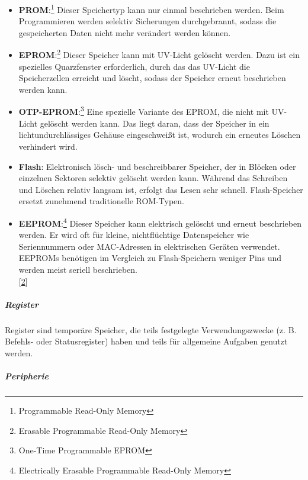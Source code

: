 \documentclass[
    headings=optiontotocandhead,%
    twoside,
    numbers=noenddot,%
    12pt, %
    titlepage, %
    parskip=full, %
    listof=leveldown, 
    numbers=noenddot, %
    a4paper,DIV=14,
    BCOR=15mm,
]{scrbook}
\begin{document}
\begin{itemize}
\item
  \textbf{PROM}:\footnote{Programmable Read-Only Memory} Dieser
  Speichertyp kann nur einmal beschrieben werden. Beim Programmieren
  werden selektiv Sicherungen durchgebrannt, sodass die gespeicherten
  Daten nicht mehr verändert werden können.
\item
  \textbf{EPROM}:\footnote{Erasable Programmable Read-Only Memory}
  Dieser Speicher kann mit UV-Licht gelöscht werden. Dazu ist ein
  spezielles Quarzfenster erforderlich, durch das das UV-Licht die
  Speicherzellen erreicht und löscht, sodass der Speicher erneut
  beschrieben werden kann.
\item
  \textbf{OTP-EPROM}:\footnote{One-Time Programmable EPROM} Eine
  spezielle Variante des EPROM, die nicht mit UV-Licht gelöscht werden
  kann. Das liegt daran, dass der Speicher in ein lichtundurchlässiges
  Gehäuse eingeschweißt ist, wodurch ein erneutes Löschen verhindert
  wird.
\item
  \textbf{Flash}: Elektronisch lösch- und beschreibbarer Speicher, der
  in Blöcken oder einzelnen Sektoren selektiv gelöscht werden kann.
  Während das Schreiben und Löschen relativ langsam ist, erfolgt das
  Lesen sehr schnell. Flash-Speicher ersetzt zunehmend traditionelle
  ROM-Typen.
\item
  \textbf{EEPROM}:\footnote{Electrically Erasable Programmable Read-Only
    Memory} Dieser Speicher kann elektrisch gelöscht und erneut
  beschrieben werden. Er wird oft für kleine, nichtflüchtige
  Datenspeicher wie Seriennummern oder MAC-Adressen in elektrischen
  Geräten verwendet. EEPROMs benötigen im Vergleich zu Flash-Speichern
  weniger Pins und werden meist seriell beschrieben.\\
  {[}\protect\hyperlink{ref-EmbeddedSystems}{2}{]}
\end{itemize}

\hypertarget{register}{%
\subparagraph{Register}\label{register}}

Register sind temporäre Speicher, die teils festgelegte
Verwendungszwecke (z. B. Befehls- oder Statusregister) haben und teils
für allgemeine Aufgaben genutzt werden.

\hypertarget{peripherie}{%
\subparagraph{Peripherie}\label{peripherie}}
\end{document}

